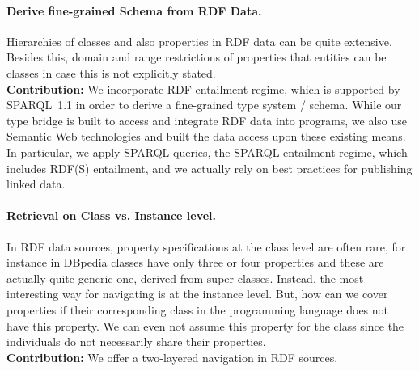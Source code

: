\documentclass{llncs} %
\begin{document}
\paragraph*{\bf Derive fine-grained Schema from RDF Data.}
Hierarchies of classes and also properties in RDF data can be quite extensive.
Besides this, domain and range restrictions of properties that entities can be classes
in case this is not explicitly stated. \\
\textbf{Contribution:} We incorporate RDF entailment regime, which is supported by SPARQL~1.1
in order to derive a fine-grained type system / schema.
While our type bridge is built to access and integrate RDF data into programs,
we also use Semantic Web technologies and built the data access upon
these existing means. In particular, we apply SPARQL queries, the SPARQL entailment regime, which
includes RDF(S) entailment, and we actually rely on best practices for publishing linked data.


\paragraph*{\bf Retrieval on Class vs. Instance level.}
In RDF data sources, property specifications at the class level are often rare,
for instance in DBpedia classes have only three or four properties and these are actually
quite generic one, derived from super-classes. Instead, the most interesting way for navigating
is at the instance level. But, how can we cover properties if their corresponding class
in the programming language does not have this property. We can even not assume this property
for the class since the individuals do not necessarily share their properties. \\
\textbf{Contribution:}  We offer a two-layered navigation in RDF sources.

\end{document}
